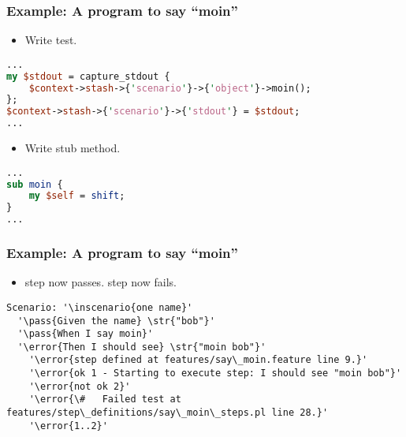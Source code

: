 \documentclass[10pt]{vcs_beamer}
\newcommand{\inscenario}[1]{\color{RoyalBlue}{#1}}
\newcommand{\str}[1]{\color{Turquoise}{#1}}
\newcommand{\error}[1]{\color{red}{#1}}
\newcommand{\pass}[1]{\color{ForestGreen}{#1}}
\newcommand{\When}{\color{RoyalBlue}{When}}
\newcommand{\Then}{\color{ForestGreen}{Then}}
\begin{document}
\begin{frame}[fragile]
\frametitle{Example: A program to say ``moin''}

\begin{itemize}
    \item Write \ttt{\When} test.
\end{itemize}

\begin{lstlisting}[language=perl]
...
my $stdout = capture_stdout {
    $context->stash->{'scenario'}->{'object'}->moin();
};
$context->stash->{'scenario'}->{'stdout'} = $stdout;
...
\end{lstlisting}

\begin{itemize}
    \item Write stub  method.
\end{itemize}

\begin{lstlisting}[language=perl]
...
sub moin {
    my $self = shift;
}
...
\end{lstlisting}

\end{frame}

\begin{frame}[fragile]
\frametitle{Example: A program to say ``moin''}

\begin{itemize}
    \item \ttt{\When} step now passes.  \ttt{\Then} step now fails.
\end{itemize}

\begin{lstlisting}[escapeinside='']
Scenario: '\inscenario{one name}'
  '\pass{Given the name} \str{"bob"}'
  '\pass{When I say moin}'
  '\error{Then I should see} \str{"moin bob"}'
    '\error{step defined at features/say\_moin.feature line 9.}'
    '\error{ok 1 - Starting to execute step: I should see "moin bob"}'
    '\error{not ok 2}'
    '\error{\#   Failed test at features/step\_definitions/say\_moin\_steps.pl line 28.}'
    '\error{1..2}'
\end{lstlisting}

\end{frame}
\end{document}

